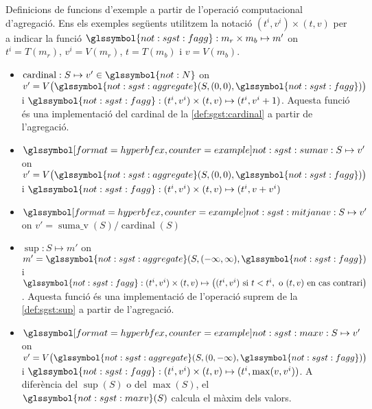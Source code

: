 \begin{example}
  Definicions de funcions d'exemple a partir de l'operació
  computacional d'agregació. Ens els exemples següents utilitzem la
  notació $(t^i,v^i) \times(t,v)$ per a indicar la funció
  $\glssymbol{not:sgst:fagg}: m_r \times m_b \mapsto m'$ on $t^i
  = T(m_r)$, $v^i=V(m_r)$, $t=T(m_b)$ i $v=V(m_b)$.


\begin{itemize}
\item $\operatorname{cardinal}: S \mapsto v'\in \glssymbol{not:N}$ on
  $v'=V\big( \glssymbol{not:sgst:aggregate}
  (S,(0,0),\glssymbol{not:sgst:fagg}) \big)$ i
  $\glssymbol{not:sgst:fagg}: (t^i,v^i) \times(t,v) \mapsto
  (t^i,v^i+1) $. Aquesta funció és una implementació del cardinal de
  la \autoref{def:sgst:cardinal} a partir de l'agregació.


\item $\glssymbolex{not:sgst:sumav}: S \mapsto v'$ on $v'=V\big(
  \glssymbol{not:sgst:aggregate} (S,(0,0),\glssymbol{not:sgst:fagg} )
  \big)$ i $\glssymbol{not:sgst:fagg}: (t^i,v^i) \times (t,v)
  \mapsto(t^i,v+v^i)$

\item $\glssymbolex{not:sgst:mitjanav}: S \mapsto v'$ on $v'=
  \operatorname{suma\_v}(S) / \operatorname{cardinal}(S)$ 

\item $\operatorname{sup}: S \mapsto m'$ on $m'=
  \glssymbol{not:sgst:aggregate}(S,(-\infty,\infty),\glssymbol{not:sgst:fagg}
  )$ i $\glssymbol{not:sgst:fagg}: (t^i,v^i)\times(t,v) \mapsto \big(
  (t^i,v^i) \text{ si } t < t^i, \text{ o } (t,v) \text{ en cas
    contrari}\big) $. Aquesta funció és una implementació de
  l'operació suprem de la \autoref{def:sgst:sup} a partir de
  l'agregació.

\item $\glssymbolex{not:sgst:maxv}: S \mapsto v'$ on $v'= V\big(
  \glssymbol{not:sgst:aggregate}
  (S,(0,-\infty),\glssymbol{not:sgst:fagg} ) \big)$ i
  $\glssymbol{not:sgst:fagg}: (t^i,v^i) \times (t,v)
  \mapsto(t^i,\max(v,v^i))$. A diferència del $\sup(S)$ o del
  $\max(S)$, el $\glssymbol{not:sgst:maxv}(S)$ calcula el màxim dels
  valors.


\end{itemize}
\end{example}

